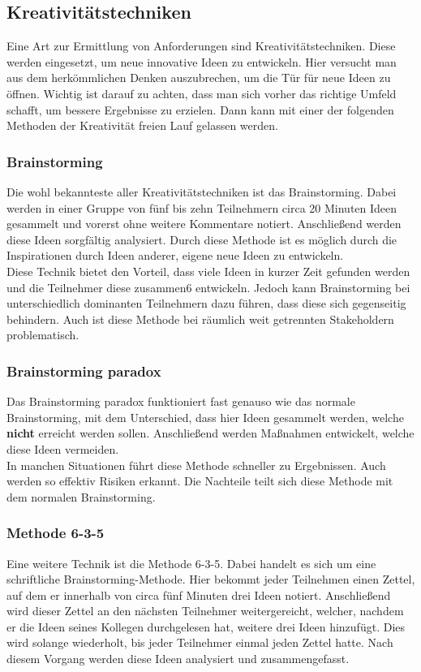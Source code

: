 \subsection{Kreativitätstechniken}
\label{subsubsec:kreativitätstechniken}
Eine Art zur Ermittlung von Anforderungen sind Kreativitätstechniken. Diese werden eingesetzt, um neue innovative Ideen zu entwickeln. Hier versucht man aus dem herkömmlichen Denken auszubrechen, um die Tür für neue Ideen zu öffnen. Wichtig ist darauf zu achten, dass man sich vorher das richtige Umfeld schafft, um bessere Ergebnisse zu erzielen. Dann kann mit einer der folgenden Methoden der Kreativität freien Lauf gelassen werden.

\subsubsection{Brainstorming}
\label{subsubsec:brainstorming}
Die wohl bekannteste aller Kreativitätstechniken ist das Brainstorming. Dabei werden in einer Gruppe von fünf bis zehn Teilnehmern circa 20 Minuten Ideen gesammelt und vorerst ohne weitere Kommentare notiert. Anschließend werden diese Ideen sorgfältig analysiert. Durch diese Methode ist es möglich durch die Inspirationen durch Ideen anderer, eigene neue Ideen zu entwickeln.\\

Diese Technik bietet den Vorteil, dass viele Ideen in kurzer Zeit gefunden werden und die Teilnehmer diese zusammen6 entwickeln. Jedoch kann Brainstorming bei unterschiedlich dominanten Teilnehmern dazu führen, dass diese sich gegenseitig behindern. Auch ist diese Methode bei räumlich weit getrennten Stakeholdern problematisch.

\subsubsection{Brainstorming paradox}
Das Brainstorming paradox funktioniert fast genauso wie das normale Brainstorming, mit dem Unterschied, dass hier Ideen gesammelt werden, welche \textbf{nicht} erreicht werden sollen. Anschließend werden Maßnahmen entwickelt, welche diese Ideen vermeiden. \\

In manchen Situationen führt diese Methode schneller zu Ergebnissen. Auch werden so effektiv Risiken erkannt. Die Nachteile teilt sich diese Methode mit dem normalen Brainstorming.

\subsubsection{Methode 6-3-5}
Eine weitere Technik ist die Methode 6-3-5. Dabei handelt es sich um eine schriftliche Brainstorming-Methode. Hier bekommt jeder Teilnehmen einen Zettel, auf dem er innerhalb von circa fünf Minuten drei Ideen notiert. Anschließend wird dieser Zettel an den nächsten Teilnehmer weitergereicht, welcher, nachdem er die Ideen seines Kollegen durchgelesen hat, weitere drei Ideen hinzufügt. Dies wird solange wiederholt, bis jeder Teilnehmer einmal jeden Zettel hatte. Nach diesem Vorgang werden diese Ideen analysiert und zusammengefasst.\\

